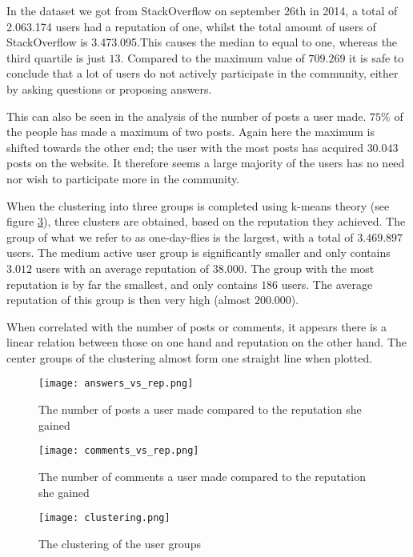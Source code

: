 \documentclass[conference]{IEEEtran}
\begin{document}
In the dataset we got from StackOverflow on september 26th in 2014, a total of 2.063.174 users had a reputation of one, whilst the total amount of users of StackOverflow is 3.473.095.This causes the median to  equal to one, whereas the third quartile is just $13$. Compared to the maximum value of $709.269$ it is safe to conclude that a lot of users do not actively participate in the community, either by asking questions or proposing answers.

This can also be seen in the analysis of the number of posts a user made. $75\%$ of the people has made a maximum of two posts. Again here the maximum is shifted towards the other end; the user with the most posts has acquired $30.043$ posts on the website. It therefore seems a large majority of the users has no need nor wish to participate more in the community.

When the clustering into three groups is completed using k-means theory (see figure \ref{kmeans_clustering}), three clusters are obtained, based on the reputation they achieved. The group of what we refer to as one-day-flies is the largest, with a total of $3.469.897$ users. The medium active user group is significantly smaller and only contains $3.012$ users with an average reputation of $38.000$. The group with the most reputation is by far the smallest, and only contains $186$ users. The average reputation of this group is then very high (almost $200.000$).

When correlated with the number of posts or comments, it appears there is a linear relation between those on one hand and reputation on the other hand. The center groups of the clustering almost form one straight line when plotted.

\begin{figure}[h]
 \texttt{[image: answers\_vs\_rep.png]}
 \caption{The number of posts a user made compared to the reputation she gained}
 \label{answers_vs_rep}
\end{figure}

\begin{figure}[h]
 \texttt{[image: comments\_vs\_rep.png]}
 \caption{The number of comments a user made compared to the reputation she gained}
 \label{comments_vs_rep}
\end{figure}

\begin{figure}[h]
 \texttt{[image: clustering.png]}
 \caption{The clustering of the user groups}
 \label{kmeans_clustering}
\end{figure}
\end{document}
